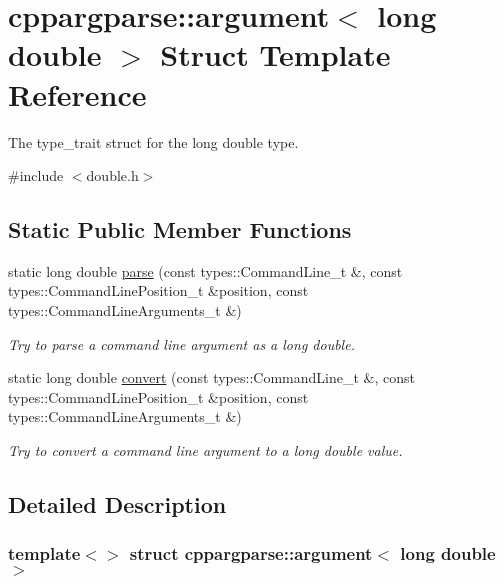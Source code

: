 \hypertarget{structcppargparse_1_1argument_3_01long_01double_01_4}{}\section{cppargparse\+:\+:argument$<$ long double $>$ Struct Template Reference}
\label{structcppargparse_1_1argument_3_01long_01double_01_4}


The type\+\_\+trait struct for the long double type.  




{\ttfamily \#include $<$double.\+h$>$}

\subsection*{Static Public Member Functions}
\begin{DoxyCompactItemize}
\item 
static long double \hyperlink{structcppargparse_1_1argument_3_01long_01double_01_4_a3030b59e675dcf51191cfc6e61bd6141}{parse} (const types\+::\+Command\+Line\+\_\+t \&, const types\+::\+Command\+Line\+Position\+\_\+t \&position, const types\+::\+Command\+Line\+Arguments\+\_\+t \&)
\begin{DoxyCompactList}\small\item\em Try to parse a command line argument as a long double. \end{DoxyCompactList}\item 
static long double \hyperlink{structcppargparse_1_1argument_3_01long_01double_01_4_a9987289594effd9b0561188827010cb2}{convert} (const types\+::\+Command\+Line\+\_\+t \&, const types\+::\+Command\+Line\+Position\+\_\+t \&position, const types\+::\+Command\+Line\+Arguments\+\_\+t \&)
\begin{DoxyCompactList}\small\item\em Try to convert a command line argument to a long double value. \end{DoxyCompactList}\end{DoxyCompactItemize}


\subsection{Detailed Description}
\subsubsection*{template$<$$>$\newline
struct cppargparse\+::argument$<$ long double $>$}

